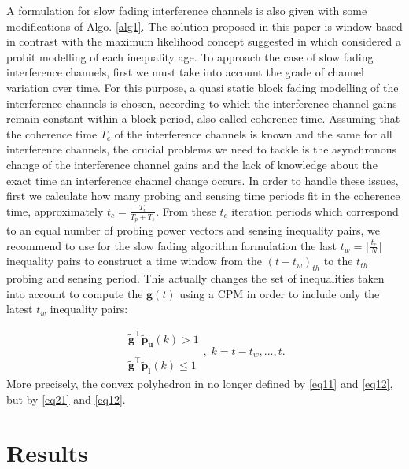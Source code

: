 \documentclass[journal]{IEEEtran}
\begin{document}
A formulation for slow fading interference channels is also given with some modifications of Algo. \ref{alg1}. The solution proposed in this paper is window-based in contrast with the maximum likelihood concept suggested in \cite{biban73} which considered a probit modelling of each inequality age. To approach the case of slow fading interference channels, first we must take into account the grade of channel variation over time. For this purpose, a quasi static block fading modelling of the interference channels is chosen, according to which the interference channel gains remain constant within a block period, also called coherence time. Assuming that the coherence time $T_{c}$ of the interference channels is known and the same for all interference channels, the crucial problems we need to tackle is the asynchronous change of the interference channel gains and the lack of knowledge about the exact time an interference channel change occurs. In order to handle these issues, first we calculate how many probing and sensing time periods fit in the coherence time, approximately $t_{c}=\frac{T_{c}}{T_{p}+T_{s}}$. From these $t_{c}$ iteration periods which correspond to an equal number of probing power vectors and sensing inequality pairs, we recommend to use for the slow fading algorithm formulation the last $t_{w}=\lfloor\frac{t_{c}}{N}\rfloor$ inequality pairs to construct a time window from the $(t-t_{w})_{th}$ to the $t_{th}$ probing and sensing period. This actually changes the set of inequalities taken into account to compute the $\mathbf{\tilde{g}}(t)$ using a CPM in order to include only the latest $t_{w}$ inequality pairs:

\begin{equation}
  \begin{array}{cc}
   \mathbf{\tilde{g}^\intercal}\mathbf{\tilde{p}_{u}}(k) > 1\\ \\
   \mathbf{\tilde{g}^\intercal}\mathbf{\tilde{p}_{l}}(k) \leq 1
  \end{array}, \; k = t-t_{w}, \ldots, t
\label{eq21}.
\end{equation}
More precisely, the convex polyhedron in no longer defined by \eqref{eq11} and \eqref{eq12}, but by \eqref{eq21} and \eqref{eq12}.


\section{Results}
\end{document}
